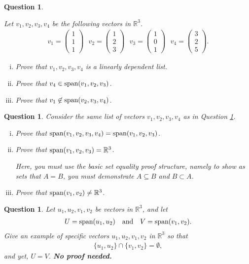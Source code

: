 \documentclass[12pt]{article}
\newtheorem{question}[thm]{Question}
\def\real{{\mathbb R}}
\def\SpanLA{\textnormal{span}}
\newcommand{\ColVecThree}[3]{\begin{pmatrix} #1\\ #2\\ #3\end{pmatrix}}
\newcommand{\intersect}{\cap}
\begin{document}
\begin{question}\label{que:LinDepInR3}
    \normalfont


    Let $v_1, v_2, v_3, v_4$ be the following vectors in $\real^3$.
    \begin{align*}
        v_1 = \ColVecThree{1}{1}{1}\ \ \
        v_2 = \ColVecThree{1}{2}{3}\ \ \
        v_3 = \ColVecThree{1}{0}{1}\ \ \
        v_4 = \ColVecThree{3}{2}{5}.
    \end{align*}


    \begin{enumerate}[(i)]
        \item Prove that $v_1, v_2, v_3, v_4$ \hspace{.1cm} is a linearly dependent list.
        \item Prove that $v_4\in\SpanLA(v_1,v_2,v_3)$.
        \item Prove that $v_1\not\in\SpanLA(v_2, v_3, v_4)$.
    \end{enumerate}
\end{question}

\vspace{1cm}

\begin{question}
    \normalfont


    Consider the same list of vectors $v_1, v_2, v_3, v_4$ \hspace{.1cm} as in Question \ref{que:LinDepInR3}.
    \begin{enumerate}[(i)]
        \item Prove that $\SpanLA(v_1, v_2, v_3, v_4) = \SpanLA(v_1, v_2, v_3)$.

        \item Prove that $\SpanLA(v_1, v_2, v_3) = \real^3$.

              Here, you must use the basic set equality proof structure, namely to show as sets that $A=B$, you must demonstrate $A\subseteq B$ and $B\subset A$.

        \item Prove that $\SpanLA(v_1, v_2)\not=\real^3$.
    \end{enumerate}
\end{question}
\vspace{1cm}




\begin{question}
    \normalfont
    Let $u_1, u_2, v_1, v_2$ be vectors in $\real^3$, and let
    \begin{align*}
        U=\SpanLA(u_1,u_2)\ \ \ \textup{and} \ \ \
        V=\SpanLA(v_1,v_2).
    \end{align*}
    Give an example of specific vectors $u_1, u_2, v_1, v_2$ in $\real^3$ so that
    \begin{align*}
        \{u_1, u_2\}\intersect \{ v_1, v_2 \} = \emptyset,
    \end{align*}
    and yet, $U=V$.  \textbf{No proof needed.}


\end{question}
\end{document}
